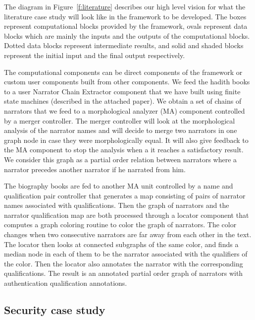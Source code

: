 \documentclass[12pt]{article}
\begin{document}
The diagram in Figure~\ref{f:literature} describes our 
high level vision for what the literature case study
will look like in the framework to be developed. 
The boxes represent 
computational blocks provided by the framework, 
ovals represent data blocks which are mainly the 
inputs and the outputs of the computational blocks. 
Dotted data blocks represent intermediate results,
and solid and shaded blocks represent the initial input 
and the final output respectively. 

The computational components can be direct components of the framework
or custom user components built from other components.
We feed the hadith books to a user Narrator Chain Extractor
component that we have built using finite state machines (described in the attached paper).
We  obtain a set of chains
of narrators that we feed to a morphological analyzer (MA) 
component controlled by a merger controller. 
The merger controller will look at the morphological analysis
of the narrator names and will decide to merge two narrators in 
one graph node in case they were morphologically equal. 
It will also give feedback to the MA component to stop the
analysis when a it reaches a satisfactory result.
We consider this graph as a partial order relation between 
narrators where a narrator precedes another narrator if 
he narrated from him. 

The biography books are fed to another MA unit controlled by 
a name and qualification pair controller that generates a 
map consisting of pairs of narrator names associated with 
qualifications. 
Then the graph of narrators and the narrator qualification map
are both processed through a locator component that computes
a graph coloring routine to color the graph of narrators. 
The color changes when two consecutive narrators are far away
from each other in the text. 
The locator then looks at connected subgraphs of the same color,
and finds a median node in each of them to be the narrator 
associated with the qualifiers of the color. 
Then the locator also annotates the narrator with the 
corresponding qualifications. 
The result is an annotated partial order graph of narrators
with authentication qualification annotations. 

\subsection{Security case study}
\label{s:design:sec}

\begin{figure}
\end{figure}
\end{document}

